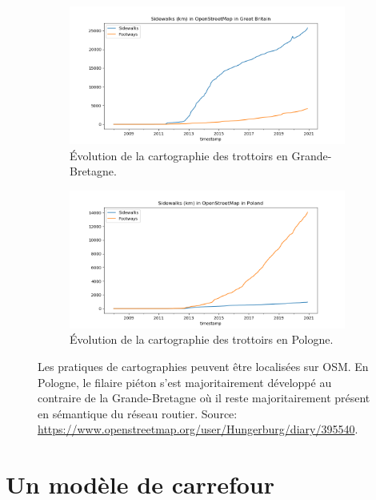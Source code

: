 \begin{figure}
    \centering
    \begin{subfigure}[t]{.49\linewidth}
        \includegraphics[width=\textwidth]{images/modelisation/Sidewalks-Length-Britain.png}
        \caption{Évolution de la cartographie des trottoirs en Grande-Bretagne.\label{fig:modelisation_osm_gb}}
    \end{subfigure}
    \begin{subfigure}[t]{.49\linewidth}
        \includegraphics[width=\textwidth]{images/modelisation/Sidewalks-Length-Poland.png}
        \caption{Évolution de la cartographie des trottoirs en Pologne. \label{fig:modelisation_osm_pologne}}
    \end{subfigure}
    \caption{Les pratiques de cartographies peuvent être localisées sur OSM. En Pologne, le filaire piéton s'est majoritairement développé au contraire de la Grande-Bretagne où il reste majoritairement présent en sémantique du réseau routier. Source: \url{https://www.openstreetmap.org/user/Hungerburg/diary/395540}.}
    \label{fig:modelisation_osm_gb_pologne}
\end{figure}

\section{Un modèle de carrefour}

